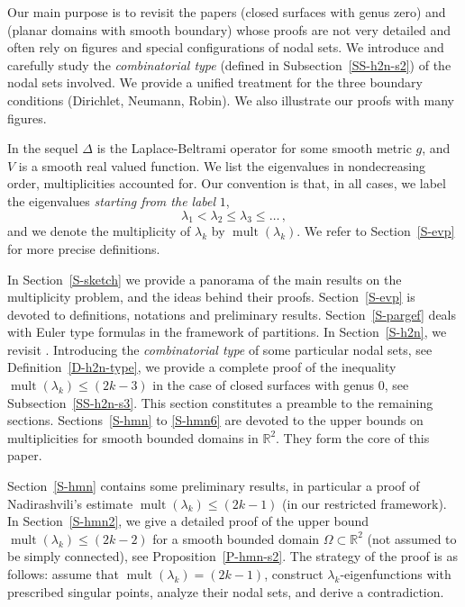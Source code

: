 \documentclass[12pt,a4paper]{amsart}
\theoremstyle{plain} %
\theoremstyle{definition}
\numberwithin{equation}{section}
\numberwithin{figure}{section}
\numberwithin{table}{section}
\newcommand{\R}{\mathbb{R}}
\DeclareMathOperator{\mult}{mult}
\begin{document}
Our main purpose is to revisit the papers \cite{HoHN1999} (closed surfaces with genus zero) and \cite{HoMN1999} (planar domains with smooth boundary) whose proofs are not very detailed and often rely on figures and special configurations of nodal sets. We introduce and carefully study the \emph{combinatorial type}  (defined in Subsection~\ref{SS-h2n-s2}) of the nodal sets involved. We provide a unified treatment for the three boundary conditions  (Dirichlet, Neumann, Robin). We also illustrate our proofs with many figures.\medskip

In the sequel $\Delta$ is the Laplace-Beltrami operator for some smooth metric $g$, and $V$ is a smooth real valued function. We list the eigenvalues in nondecreasing order, multiplicities accounted for. Our convention is that, in all cases, we label the eigenvalues \emph{starting from the label} $1$,
%
\begin{equation*}
\lambda_1 < \lambda_2 \le \lambda_3 \le \ldots \,,
\end{equation*}
%
and we denote the multiplicity of $\lambda_k$ by $\mult(\lambda_k)$. We refer to Section~\ref{S-evp} for more precise definitions.\medskip

In Section~\ref{S-sketch} we provide a panorama of the main results on the multiplicity problem, and the ideas behind their proofs. Section~\ref{S-evp} is devoted to definitions, notations and preliminary results. Section~\ref{S-pargef} deals with Euler type formulas in the framework of partitions. In Section~\ref{S-h2n}, we revisit \cite{HoHN1999}. Introducing the \emph{combinatorial type} of some particular nodal sets, see Definition~\ref{D-h2n-type}, we provide a complete proof of the inequality $\mult(\lambda_k) \le (2k-3)$ in the case of closed surfaces with genus $0$, see Subsection~\ref{SS-h2n-s3}. This section constitutes a preamble to the remaining sections. Sections~\ref{S-hmn} to \ref{S-hmn6} are devoted to the upper bounds on multiplicities for smooth bounded domains in $\R^2$. They form the core of this paper.\smallskip

Section~\ref{S-hmn} contains some preliminary results, in particular a proof of Nadirashvili's estimate $\mult(\lambda_k) \le (2k-1)$ (in our restricted framework).  In Section~\ref{S-hmn2}, we give a detailed proof of the upper bound $\mult(\lambda_k) \le (2k-2)$ for a smooth bounded domain $\Omega \subset \R^2$ (not assumed to be simply connected), see Proposition~\ref{P-hmn-s2}. The strategy of the proof is as follows: assume that $\mult(\lambda_k) = (2k-1)$, construct $\lambda_k$-eigenfunctions with prescribed singular points, analyze their nodal sets, and derive a contradiction.\smallskip
\end{document}
